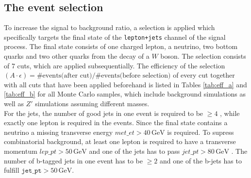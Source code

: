 \subsection{The event selection}
To increase the signal to background ratio, a selection is applied which specifically targets the final state of the \texttt{lepton+jets}
channel of the signal process.
The final state consists of one charged lepton, a neutrino, two bottom quarks and two other quarks from the
decay of a $W$ boson. The selection consists of 7 cuts, which are applied subsequentially.
The efficiency of the selection $(A \cdot \epsilon) = \# \text{events(after cut)} / \# \text{events(before selection)}$ of every cut together with all
cuts that have been applied beforehand is listed in Tables \ref{tab:eff_a} and \ref{tab:eff_b} for all Monte Carlo samples, which include background simulations as well as $Z\prime$ simulations assuming different masses.\\
For the jets, the number of good jets in one event is required to be $\geq 4$
, while exactly one lepton is required
in the events. Since the final state contains a neutrino
a missing
transverse energy $met\_et > 40 \, \si{\giga\eV}$
 is required. To supress combinatorial background,
at least one lepton is required to have a transverse momentum $lep\_pt > 50 \, \si{\giga\eV}$
 and one of
the jets has to pass $jet\_pt > 80 \, \si{\giga\eV}$
. The number of b-tagged jets in one event has to be
$\geq 2$
 and one of the b-jets has to fulfill $\texttt{jet\_pt} > 50 \, \si{\giga\eV}$.%
